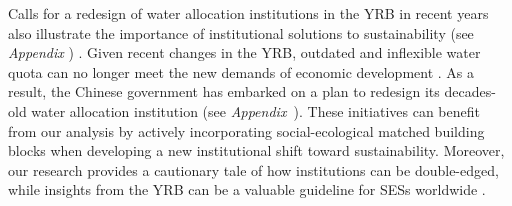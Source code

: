 Calls for a redesign of water allocation institutions in the YRB in recent years also illustrate the importance of institutional solutions to sustainability (see \textit{Appendix }) \cite{yu2019}.
Given recent changes in the YRB, outdated and inflexible water quota can no longer meet the new demands of economic development \cite{wang2019a}.
As a result, the Chinese government has embarked on a plan to redesign its decades-old water allocation institution (see \textit{Appendix~}).
These initiatives can benefit from our analysis by actively incorporating social-ecological matched building blocks when developing a new institutional shift toward sustainability.
Moreover, our research provides a cautionary tale of how institutions can be double-edged, while insights from the YRB can be a valuable guideline for SESs worldwide \cite{cumming2020b, muneepeerakul2017, cumming2020a, leslie2015}.
